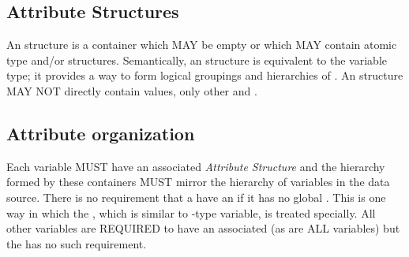 \documentclass[justify]{nasa-ese}
\renewcommand{\new}[1]{\emph{#1}}
\begin{document}
\subsection{Attribute Structures}
\label{sec-attr-structure}

An \Attribute structure is a container which MAY be empty or which MAY
contain atomic type \Attributes and/or \Attribute structures.
Semantically, an \Attribute structure is equivalent to the \Structure
variable type; it provides a way to form logical groupings and hierarchies of
\Attributes. An \Attribute structure MAY NOT directly contain values, only
other \Attributes and \Attribute \Structures.

\subsection{Attribute organization}
\label{sec-attribute-organization}

Each variable MUST have an associated \new{Attribute Structure} and the
hierarchy formed by these containers MUST mirror the hierarchy of variables
in the data source. There is no requirement that a \Dataset have an
\Attribute \Structure if it has no global \Attributes. This is one way in
which the \Dataset, which is similar to \Structure-type variable, is treated
specially. All other \Structure variables are REQUIRED to have an associated
\Attribute \Structure (as are ALL variables) but the \Dataset has no such
requirement.



 

\end{document}
